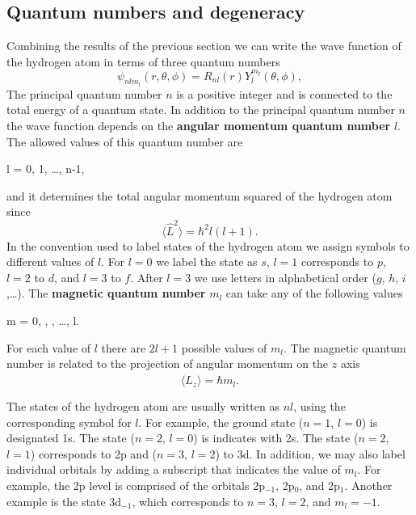 \documentclass[../Main/chem331-notes.tex]{subfiles}
\begin{document}
\subsection{Quantum numbers and degeneracy}
Combining the results of the previous section we can write the wave function of the hydrogen atom in terms of three quantum numbers
\begin{equation}
\psi_{nlm_l}(r,\theta,\phi) = R_{nl}(r) Y_l^{m_l}(\theta,\phi),
\end{equation}
The principal quantum number $n$ is a positive integer and is connected to the total energy of a quantum state. 
In addition to the principal quantum number $n$ the wave function depends on the \textbf{angular momentum quantum number} $l$.  The allowed values of this quantum number are
\begin{iequation}
l = 0, 1, \ldots, n-1,
\end{iequation}
and it determines the total angular momentum squared of the hydrogen atom since
\begin{equation}
\langle \hat{L}^2 \rangle = \hbar^2 l(l + 1).
\end{equation}
In the convention used to label states of the hydrogen atom we assign symbols to different values of $l$. For $l = 0$ we label the state as $s$, $l = 1$ corresponds to $p$, $l= 2$ to $d$, and $l = 3$ to $f$. After $l=3$ we use letters in alphabetical order ($g$, $h$, $i$,\ldots).
The \textbf{magnetic quantum number} $m_l$ can take any of the following values
\begin{iequation}
m = 0, , ,  \ldots, l.
\end{iequation}
For each value of $l$ there are $2l +1$ possible values of $m_l$. 
The magnetic quantum number is related to the projection of angular momentum on the $z$ axis
\begin{equation}
\langle \hat{L}_z \rangle = \hbar m_l.
\end{equation}

The states of the hydrogen atom are usually written as $nl$, using the corresponding symbol for $l$.
For example, the ground state ($n=1$, $l=0$) is designated 1s. The state ($n=2$, $l=0$) is indicates with 2s. The state ($n=2$, $l=1$) corresponds to 2p and ($n=3$, $l=2$) to 3d.
In addition, we may also label individual orbitals by adding a subscript that indicates the value of $m_l$.
For example, the 2p level is comprised of the orbitals 2p$_{-1}$, 2p$_{0}$, and 2p$_{1}$. Another example is the state 3d$_{-1}$, which corresponds to $n = 3$, $l = 2$, and $m_l = -1$.
\end{document}
